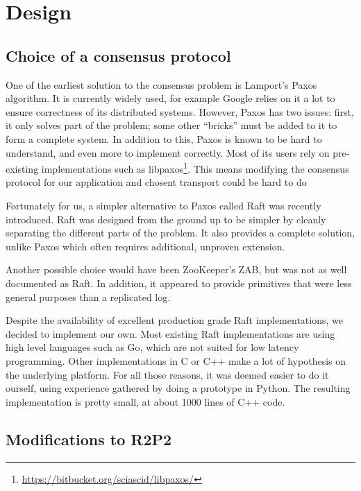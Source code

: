 \chapter{Design}
\label{chap:design}

\section{Choice of a consensus protocol}

One of the earliest solution to the consensus problem is Lamport's Paxos algorithm\cite{paxos}.
It is currently widely used, for example Google relies on it a lot to ensure correctness of its distributed systems\cite{chubby, paxoslive}.
However, Paxos has two issues: first, it only solves part of the problem; some other ``bricks'' must be added to it to form a complete system.
In addition to this, Paxos is known to be hard to understand, and even more to implement correctly.
Most of its users rely on pre-existing implementations such as libpaxos\footnote{\url{https://bitbucket.org/sciascid/libpaxos/}}.
This means modifying the consensus protocol for our application and chosent transport could be hard to do

Fortunately for us, a simpler alternative to Paxos called Raft was recently introduced\cite{raft}.
Raft was designed from the ground up to be simpler by cleanly separating the different parts of the problem.
It also provides a complete solution, unlike Paxos which often requires additional, unproven extension\cite{paxoslive}.

Another possible choice would have been ZooKeeper's ZAB\cite{zookeeper}, but was not as well documented as Raft.
In addition, it appeared to provide primitives that were less general purposes than a replicated log.

Despite the availability of excellent production grade Raft implementations, we decided to implement our own.
Most existing Raft implementations are using high level languages such as Go, which are not suited for low latency programming.
Other implementations in C or C++ make a lot of hypothesis on the underlying platform.
For all those reasons, it was deemed easier to do it ourself, using experience gathered by doing a prototype in Python.
The resulting implementation is pretty small, at about 1000 lines of C++ code.

\section{Modifications to R2P2}


